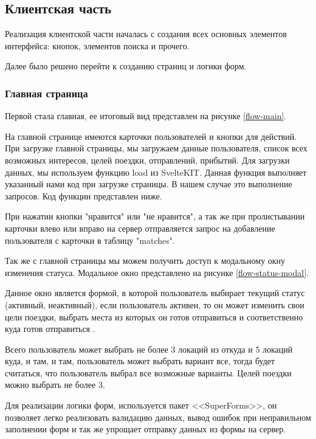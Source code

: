 \subsection{Клиентская часть}

Реализация клиентской части началась с создания всех основных элементов интерфейса: кнопок, элементов поиска и прочего.

Далее было решено перейти к созданию страниц и логики форм.

\subsubsection{Главная страница}
Первой стала главная, ее итоговый вид представлен на рисунке \ref{flow-main}.


На главной странице имеются карточки пользователей и кнопки для действий. При загрузке главной страницы, мы загружаем данные пользователя, список всех возможных интересов, целей поездки, отправлений, прибытий. Для загрузки данных, мы используем функцию load из SvelteKIT. Данная функция выполняет указанный нами код при загрузке страницы. В нашем случае это выполнение запросов. Код функции представлен ниже.


При нажатии кнопки "нравится" или "не нравится", а так же при пролистывании карточки влево или вправо на сервер отправляется запрос на добавление пользователя с карточки в таблицу "matches".

Так же с главной страницы мы можем получить доступ к модальному окну изменения статуса. Модальное окно представлено на рисунке \ref{flow-status-modal}.


Данное окно является формой, в которой пользователь выбирает текущий статус (активный, неактивный), если пользователь активен, то он может изменить свои цели поездки, выбрать места из которых он готов отправиться и соответственно куда готов отправиться \cite{svelte-superforms}.

Всего пользователь может выбрать не более 3 локаций из откуда и 5 локаций куда, и там, и там, пользователь может выбрать вариант все, тогда будет считаться, что пользователь выбрал все возможные варианты. Целей поездки можно выбрать не более 3.

Для реализации логики форм, используется пакет <<SuperForms>>, он позволяет легко реализовать валидацию данных, вывод ошибок при неправильном заполнении форм и так же упрощает отправку данных из формы на сервер.

